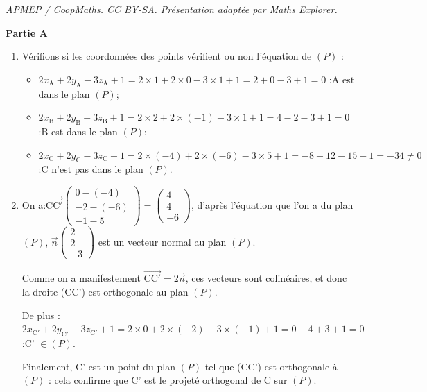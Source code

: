 \documentclass[10pt]{article}
\providecommand{\vect}[1]{\overrightarrow{#1}}
\begin{document}
\noindent\textit{APMEP / CoopMaths. CC BY-SA. Présentation adaptée par Maths Explorer.}\par\medskip
\medskip
\textbf{Partie A}
\medskip

\begin{enumerate}
\item Vérifions si les coordonnées des points vérifient ou non l'équation de $(P)$ :
	\begin{itemize}
		\item $2x_\mathrm{A} + 2y_\mathrm{A} -3z_\mathrm{A} +1= 2\times 1 + 2 \times 0 - 3 \times 1 +1= 2 + 0 - 3 +1= 0 $ :\quad A est dans le plan $(P)$;
		\item $2x_\mathrm{B} + 2y_\mathrm{B} -3z_\mathrm{B} +1= 2\times 2 + 2 \times (-1) - 3 \times 1+1 = 4 -2 - 3 +1= 0$ :\quad B est dans le plan $(P)$;
		\item $2x_\mathrm{C} + 2y_\mathrm{C} -3z_\mathrm{C} +1= 2\times (-4) + 2 \times (-6) - 3 \times 5+1 = -8 -12 - 15 +1= -34 \neq 0$ :\quad C n'est pas dans le plan $(P)$.
	\end{itemize}

\item On a:\quad $ \vect{\mathrm{CC'}}\begin{pmatrix} 0-(-4)\\-2-(-6)\\-1-5 \end{pmatrix} = \begin{pmatrix}4\\4\\-6\end{pmatrix} $, d'après l'équation que l'on a du plan $ (P) $, $ \vect{n}\begin{pmatrix} 2\\2\\-3 \end{pmatrix} $ est un vecteur normal au plan $ (P) $.

Comme on a manifestement $ \vect{\mathrm{CC'}} = 2\vect{n} $, ces vecteurs sont colinéaires, et donc la droite (CC') est orthogonale au plan $ (P) $.

De plus :
\quad
	$2x_\mathrm{C'} + 2y_\mathrm{C'} -3z_\mathrm{C'} + 1 = 2\times 0 + 2 \times (-2) - 3 \times (-1) + 1 = 0 - 4 + 3 + 1 = 0$ :\quad C' $\in(P)$.

Finalement, C' est un point du plan $ (P) $ tel que (CC') est orthogonale à $(P)$ : cela confirme que C' est le projeté orthogonal de C sur $(P)$.


\end{enumerate}
\end{document}

